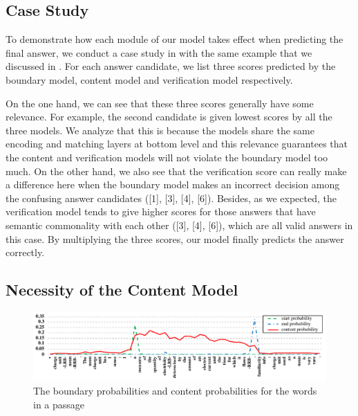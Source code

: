 \subsection{Case Study}

To demonstrate how each module of our model takes effect when predicting the final answer, we conduct a case study in  with the same example that we discussed in . For each answer candidate, we list three scores predicted by the boundary model, content model and verification model respectively. 

On the one hand, we can see that these three scores generally have some relevance. For example, the second candidate is given lowest scores by all the three models. We analyze that this is because the models share the same encoding and matching layers at bottom level and this relevance guarantees that the content and verification models will not violate the boundary model too much. On the other hand, we also see that the verification score can really make a difference here when the boundary model makes an incorrect decision among the confusing answer candidates ([1], [3], [4], [6]). Besides, as we expected, the verification model tends to give higher scores for those answers that have semantic commonality with each other ([3], [4], [6]), which are all valid answers in this case. By multiplying the three scores, our model finally predicts the answer correctly.  

\subsection{Necessity of the Content Model}
\label{necessity}
\begin{figure}[tb]
\centering
\includegraphics[width=\textwidth]{score.pdf}

\caption{The boundary probabilities and content probabilities for the words in a passage}
\label{fig:content}
\end{figure}


